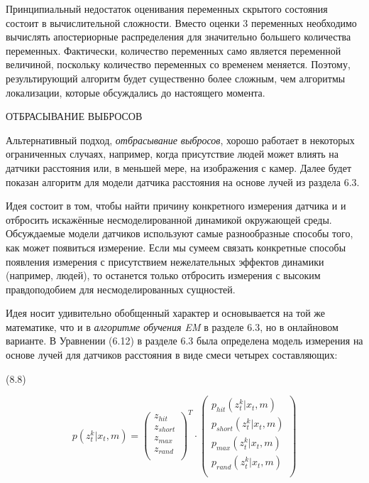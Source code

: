 \documentclass[10pt,a4paper]{article}
\begin{document}
Принципиальный недостаток оценивания переменных скрытого состояния состоит в вычислительной сложности. Вместо оценки 3 переменных необходимо вычислять апостериорные распределения для значительно большего количества переменных. Фактически, количество переменных само является переменной величиной, поскольку количество переменных со временем меняется. Поэтому, результирующий алгоритм будет существенно более сложным, чем алгоритмы локализации, которые обсуждались до настоящего момента.

ОТБРАСЫВАНИЕ ВЫБРОСОВ

Альтернативный подход, \textit{отбрасывание выбросов}, хорошо работает в некоторых ограниченных случаях, например, когда присутствие людей может влиять на датчики расстояния или, в меньшей мере, на изображения с камер. Далее будет показан алгоритм для модели датчика расстояния на основе лучей из раздела 6.3.

Идея состоит в том, чтобы найти причину конкретного измерения датчика и и отбросить искажённые несмоделированной динамикой окружающей среды. Обсуждаемые модели датчиков используют самые разнообразные способы того, как может появиться измерение. Если мы сумеем связать конкретные способы появления измерения с присутствием нежелательных эффектов динамики (например, людей), то останется только отбросить измерения с высоким правдоподобием для несмоделированных сущностей. 

Идея носит удивительно обобщенный характер и основывается на той же математике, что и в \textit{алгоритме обучения EM }в разделе 6.3, но в онлайновом варианте. В Уравнении (6.12) в разделе 6.3 была определена модель измерения на основе лучей для датчиков расстояния в виде смеси четырех составляющих:

(8.8)
\begin{minipage}{0.2\textwidth}
	\begin{equation*}
	p(z_t^k|x_t,m)=
	\left(\begin{array}{c}
	z_{hit}\\
	z_{short}\\
	z_{max}\\
	z_{rand}\\
	\end{array}\right)^T
	\cdot
	\left(\begin{array}{c}
	p_{hit}(z_t^k|x_t,m)\\
	p_{short}(z_t^k|x_t,m)\\
	p_{max}(z_t^k|x_t,m)\\
	p_{rand}(z_t^k|x_t,m)\\
	\end{array}\right)
	\end{equation*}
\end{minipage}\\
\end{document}
